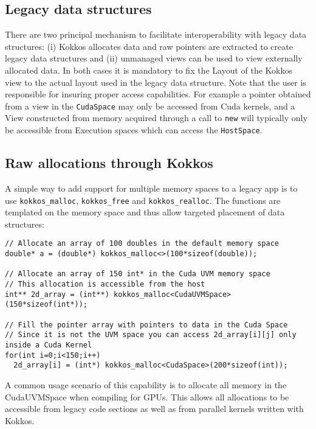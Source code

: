 \subsection{Legacy data structures}

There are two principal mechanism to facilitate interoperability with legacy data 
structures: (i) Kokkos allocates data and raw pointers are extracted to create 
legacy data structures and (ii) unmanaged views can be used to view externally 
allocated data. In both cases it is mandatory to fix the Layout of the Kokkos view
to the actual layout used in the legacy data structure. Note that the user is responsible
for insuring proper access capabilities. For example a pointer obtained from a view
in the \lstinline|CudaSpace| may only be accessed from Cuda kernels, and a View
constructed from memory acquired through a call to \lstinline|new| will typically only 
be accessible from Execution spaces which can access the \lstinline|HostSpace|.

\subsection{Raw allocations through Kokkos}

A simple way to add support for multiple memory spaces to a legacy app is to 
use \lstinline|kokkos_malloc|, \lstinline|kokkos_free| and \lstinline|kokkos_realloc|.
The functions are templated on the memory space and thus allow targeted 
placement of data structures: 

\begin{lstlisting}
// Allocate an array of 100 doubles in the default memory space
double* a = (double*) kokkos_malloc<>(100*sizeof(double)); 

// Allocate an array of 150 int* in the Cuda UVM memory space
// This allocation is accessible from the host
int** 2d_array = (int**) kokkos_malloc<CudaUVMSpace>(150*sizeof(int*));

// Fill the pointer array with pointers to data in the Cuda Space
// Since it is not the UVM space you can access 2d_array[i][j] only inside a Cuda Kernel
for(int i=0;i<150;i++)
  2d_array[i] = (int*) kokkos_malloc<CudaSpace>(200*sizeof(int));
\end{lstlisting}

A common usage scenario of this capability is to allocate all memory in the CudaUVMSpace 
when compiling for GPUs. This allows all allocations to be accessible from legacy code sections
as well as from parallel kernels written with Kokkos. 

